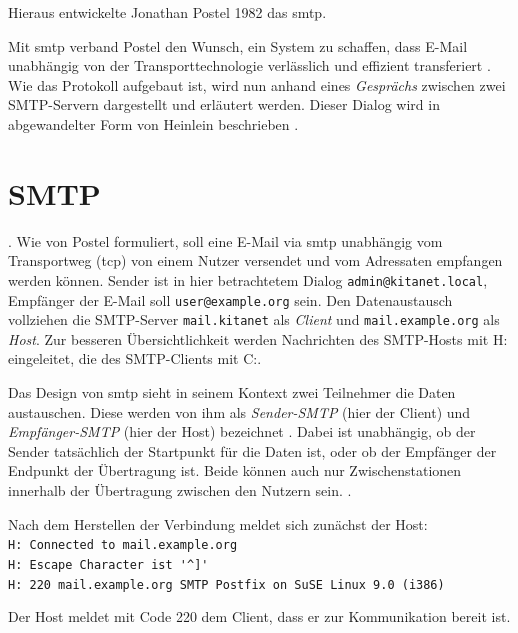 Hieraus entwickelte Jonathan Postel 1982 das \acf{smtp}.

Mit \ac{smtp} verband Postel den Wunsch, ein System zu schaffen, dass E-Mail unabhängig von der Transporttechnologie verlässlich und effizient transferiert \citep[vgl.][1]{rfc821}. Wie das Protokoll aufgebaut ist, wird nun anhand eines \textit{Gesprächs} zwischen zwei SMTP-Servern dargestellt und erläutert werden. Dieser Dialog wird in abgewandelter Form von Heinlein beschrieben \citep[vgl.][S. 24 ff.]{Heinlein2004}. 

\section{SMTP}

 \citep[][11]{rfc821}.
Wie von Postel formuliert, soll eine E-Mail via \ac{smtp} unabhängig vom Transportweg (\zb \ac{tcp}) von einem Nutzer versendet und vom Adressaten empfangen werden können. Sender ist in hier betrachtetem Dialog \verb+admin@kitanet.local+, Empfänger der E-Mail soll \verb+user@example.org+ sein. Den Datenaustausch vollziehen die SMTP-Server \verb+mail.kitanet+ als \textit{Client} und \verb+mail.example.org+ als \textit{Host}. Zur besseren Übersichtlichkeit werden Nachrichten des SMTP-Hosts mit H: eingeleitet, die des SMTP-Clients mit C:.

Das Design von \ac{smtp} sieht in seinem Kontext zwei Teilnehmer die Daten austauschen. Diese werden von ihm als \textit{Sender-SMTP} (hier der Client) und \textit{Empfänger-SMTP} (hier der Host) bezeichnet \citep[vgl.][2]{rfc821}. Dabei ist unabhängig, ob der Sender tatsächlich der Startpunkt für die Daten ist, oder ob der Empfänger der Endpunkt der Übertragung ist. Beide können auch nur Zwischenstationen innerhalb der Übertragung zwischen den Nutzern sein.  \citep[][2]{rfc821}.

Nach dem Herstellen der Verbindung meldet sich zunächst der Host:\\
\verb+H: Connected to mail.example.org+ \\ 
\verb+H: Escape Character ist '^]'+ \\
\verb+H: 220 mail.example.org SMTP Postfix on SuSE Linux 9.0 (i386)+

Der Host meldet mit Code 220  \citep[][38]{rfc821} dem Client, dass er zur Kommunikation bereit ist. 

